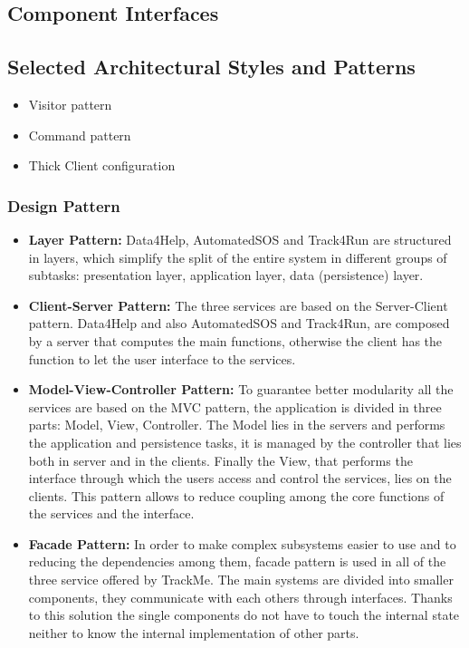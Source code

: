 \documentclass[a4paper]{article}
\begin{document}
\subsection{Component Interfaces}

\subsection{Selected Architectural Styles and Patterns}
\begin{itemize}
    \item Visitor pattern
    \item Command pattern
    \item Thick Client configuration
\end{itemize}

\subsubsection{Design Pattern}

\begin{itemize}
    \item \textbf{Layer Pattern:}
     Data4Help, AutomatedSOS and Track4Run are structured in layers, which simplify the split of the entire system in different groups of subtasks: presentation layer, application layer, data (persistence) layer.
     
    \item \textbf{Client-Server Pattern:} The three services are based on the Server-Client pattern. Data4Help and also AutomatedSOS and Track4Run, are composed by a server that computes the main functions, otherwise the client has the function to let the user interface to the services.
    
    \item \textbf{Model-View-Controller Pattern:} To guarantee better modularity all the services are based on the MVC pattern, the application is divided in three parts: Model, View, Controller. The Model lies in the servers and performs the application and persistence tasks, it is managed by the controller that lies both in server and in the clients. Finally the View, that performs the interface through which the users access and control the services, lies on the clients. This pattern allows to reduce coupling among the core functions of the services and the interface.
    
    \item \textbf{Facade Pattern:} In order to make complex subsystems easier to use and to reducing the dependencies among them, facade pattern is used in all of the three service offered by TrackMe. The main systems are divided into smaller components, they communicate with each others through interfaces. Thanks to this solution the single components do not have to touch the internal state neither to know the internal implementation of other parts.
    
\end{itemize}
\end{document}
